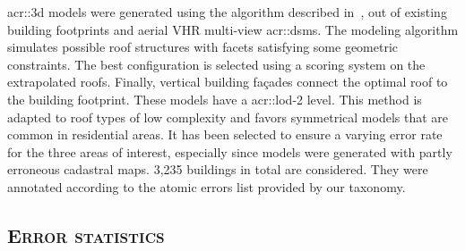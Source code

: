         \gls{acr::3d} models were generated using the algorithm described in~\parencite{durupt2006automatic}, out of existing building footprints and aerial VHR multi-view \glspl{acr::dsm}.
        The modeling algorithm simulates possible roof structures with facets satisfying some geometric constraints.
        The best configuration is selected using a scoring system on the extrapolated roofs.
        Finally, vertical building fa\c{c}ades connect the optimal roof to the building footprint.
        These models have a \gls{acr::lod}-2 level.
        This method is adapted to roof types of low complexity and favors symmetrical models that are common in residential areas.
        It has been selected to ensure a varying error rate for the three areas of interest, especially since models were generated with partly erroneous cadastral maps.
        3,235 buildings in total are considered.
        They were annotated according to the atomic errors list provided by our taxonomy.

    \subsection{\textsc{Error statistics}}
        \label{subsec::experiments::datasets::stats}
        \begin{figure}[htpb]
            \centering
        \end{figure}
        \begin{figure}[htpb]
            \centering
        \end{figure}
        \begin{figure}
            \centering
        \end{figure}

